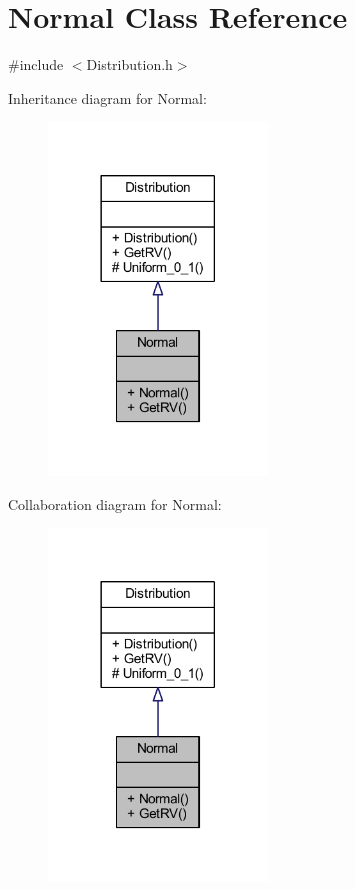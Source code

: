 \hypertarget{class_normal}{}\section{Normal Class Reference}
\label{class_normal}


{\ttfamily \#include $<$Distribution.\+h$>$}



Inheritance diagram for Normal\+:\nopagebreak
\begin{figure}[H]
\begin{center}
\leavevmode
\includegraphics[width=165pt]{class_normal__inherit__graph}
\end{center}
\end{figure}


Collaboration diagram for Normal\+:\nopagebreak
\begin{figure}[H]
\begin{center}
\leavevmode
\includegraphics[width=165pt]{class_normal__coll__graph}
\end{center}
\end{figure}
